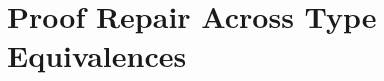 \chapter{Proof Repair Across Type Equivalences}



%

%

%

%

%

%

%

%

%

%

%

%

%

%

%

%

%

